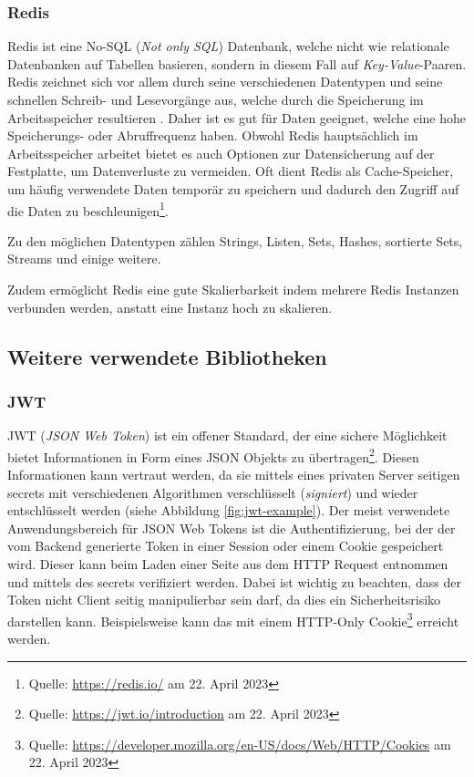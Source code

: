         \subsubsection{Redis}
        \label{sec:redis}
        \begin{savenotes}
Redis ist eine No-SQL (\textit{Not only SQL}) Datenbank, welche nicht wie relationale Datenbanken auf Tabellen basieren, sondern in diesem Fall auf \textit{Key-Value}-Paaren. Redis zeichnet sich vor allem durch seine verschiedenen Datentypen und seine schnellen Schreib- und Lesevorgänge aus, welche durch die Speicherung im Arbeitsspeicher resultieren \cite{redis-book}. Daher ist es gut für Daten geeignet, welche eine hohe Speicherungs- oder Abruffrequenz haben. Obwohl Redis hauptsächlich im Arbeitsspeicher arbeitet bietet es auch Optionen zur Datensicherung auf der Festplatte, um Datenverluste zu vermeiden. Oft dient Redis als Cache-Speicher, um häufig verwendete Daten temporär zu speichern und dadurch den Zugriff auf die Daten zu beschleunigen\footnote{Quelle: \url{https://redis.io/}\label{fn:redis} am 22. April 2023}. 
\end{savenotes}
Zu den möglichen Datentypen zählen Strings, Listen, Sets, Hashes, sortierte Sets, Streams und einige weitere. 	

 Zudem ermöglicht Redis eine gute Skalierbarkeit indem mehrere Redis Instanzen verbunden werden, anstatt eine Instanz hoch zu skalieren.
       
        \subsection{Weitere verwendete Bibliotheken}
        \label{sec:weiteres}
        \subsubsection{JWT}
        \label{sec:JWT}
JWT (\textit{JSON Web Token}) ist ein offener Standard, der eine sichere Möglichkeit bietet Informationen in Form eines JSON Objekts zu übertragen\footnote{Quelle: \url{https://jwt.io/introduction} am 22. April 2023}. Diesen Informationen kann vertraut werden, da sie mittels eines privaten Server seitigen secrets mit verschiedenen Algorithmen  verschlüsselt (\textit{signiert}) und wieder entschlüsselt werden (siehe Abbildung \ref{fig:jwt-example}). Der meist verwendete Anwendungsbereich für JSON Web Tokens ist die Authentifizierung, bei der der vom Backend generierte Token in einer Session oder einem Cookie gespeichert wird. Dieser kann beim Laden einer Seite aus dem HTTP Request entnommen und mittels des secrets verifiziert werden. Dabei ist wichtig zu beachten, dass der Token nicht Client seitig manipulierbar sein darf, da dies ein Sicherheitsrisiko darstellen kann. Beispielsweise kann das mit einem HTTP-Only Cookie\footnote{Quelle: \url{https://developer.mozilla.org/en-US/docs/Web/HTTP/Cookies} am 22. April 2023} erreicht werden.

